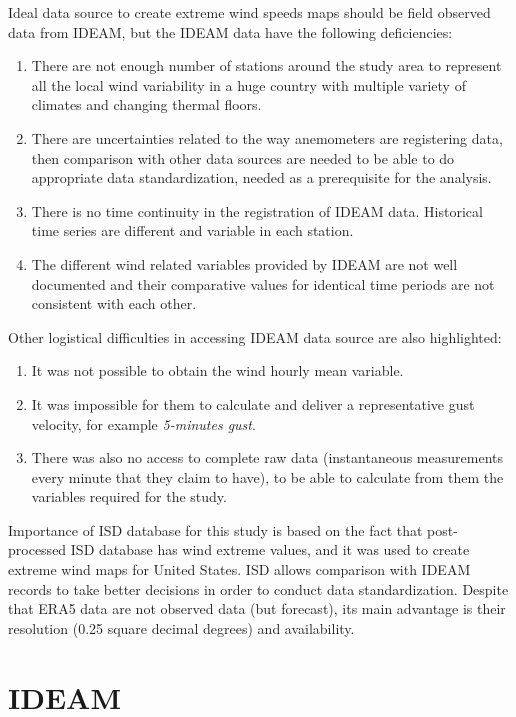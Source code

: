 \documentclass[12pt,twoside]{reedthesis}
\begin{document}
Ideal data source to create extreme wind speeds maps should be field observed data from IDEAM, but the IDEAM data have the following deficiencies:
\begin{enumerate}
\def\labelenumi{\arabic{enumi}.}
\item
  There are not enough number of stations around the study area to represent all the local wind variability in a huge country with multiple variety of climates and changing thermal floors.
\item
  There are uncertainties related to the way anemometers are registering data, then comparison with other data sources are needed to be able to do appropriate data standardization, needed as a prerequisite for the analysis.
\item
  There is no time continuity in the registration of IDEAM data. Historical time series are different and variable in each station.
\item
  The different wind related variables provided by IDEAM are not well documented and their comparative values for identical time periods are not consistent with each other.
\end{enumerate}
Other logistical difficulties in accessing IDEAM data source are also highlighted:
\begin{enumerate}
\def\labelenumi{\arabic{enumi}.}
\item
  It was not possible to obtain the wind hourly mean variable.
\item
  It was impossible for them to calculate and deliver a representative gust velocity, for example \emph{5-minutes gust}.
\item
  There was also no access to complete raw data (instantaneous measurements every minute that they claim to have), to be able to calculate from them the variables required for the study.
\end{enumerate}
Importance of ISD database for this study is based on the fact that post-processed ISD database has wind extreme values, and it was used to create extreme wind maps for United States. ISD allows comparison with IDEAM records to take better decisions in order to conduct data standardization. Despite that ERA5 data are not observed data (but forecast), its main advantage is their resolution (0.25 square decimal degrees) and availability.

\hypertarget{ideam}{%
\section{IDEAM}\label{ideam}}
\end{document}
